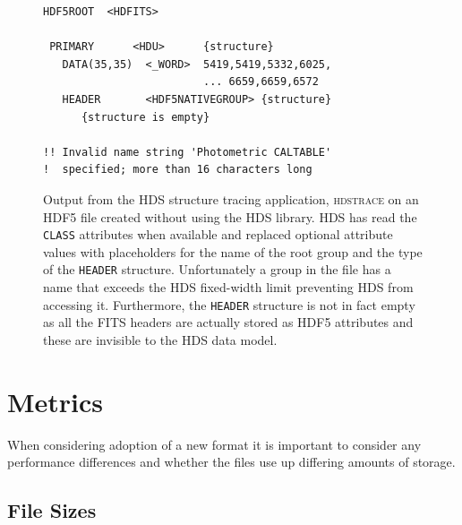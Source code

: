 \documentclass[final,authoryear,5p,times,twocolumn]{elsarticle}
\begin{document}
\begin{figure}
\small
\begin{verbatim}
HDF5ROOT  <HDFITS>

 PRIMARY      <HDU>      {structure}
   DATA(35,35)  <_WORD>  5419,5419,5332,6025,
                         ... 6659,6659,6572
   HEADER       <HDF5NATIVEGROUP> {structure}
      {structure is empty}

!! Invalid name string 'Photometric CALTABLE'
!  specified; more than 16 characters long
\end{verbatim}
\caption{Output from the HDS structure tracing application,
  \textsc{hdstrace} on an HDF5 file created without using the HDS
  library. HDS has read the \texttt{CLASS} attributes when available
  and replaced optional attribute values with placeholders for the
  name of the root group and the type of the \texttt{HEADER}
  structure. Unfortunately a group in the file has a name that exceeds
  the HDS fixed-width limit preventing HDS from accessing it. Furthermore,
  the \texttt{HEADER} structure is not in fact empty as all the FITS headers
  are actually stored as HDF5 attributes and these are invisible to the HDS
  data model.}
\label{fig:h5traces}
\end{figure}

\section{Metrics}

When considering adoption of a new format it is important to
consider any performance differences and whether the files use up
differing amounts of storage.

\subsection{File Sizes}
\end{document}

